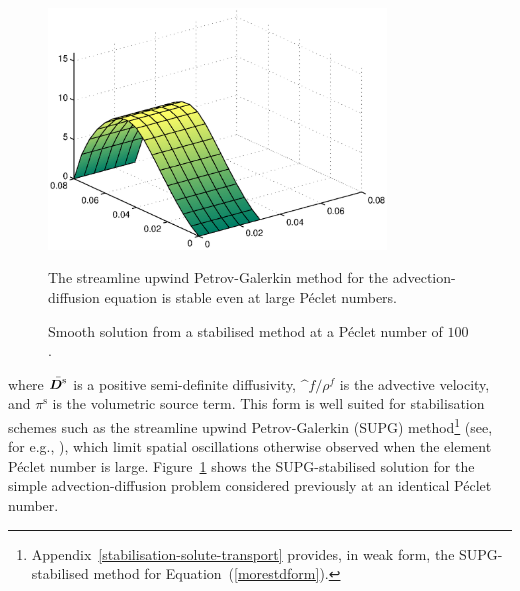 \begin{figure}
  \begin{center}
    \includegraphics[width=0.8\textwidth]{images/elucidation/stable-advection.eps}
    \caption{Smooth solution from a stabilised method at a P\'eclet
      number of $100$.}
    \label{stable-solution}
  \end{center}
      {The streamline upwind Petrov-Galerkin method for the
        advection-diffusion equation is stable even at large P\'eclet
        numbers.}
\end{figure}

\noindent where $\bar{\mbox{\boldmath$ D$}^\mathrm{s}}$ is a positive semi-definite
diffusivity, $\bm^{f}/\rho^{f}$ is the advective velocity, and
$\pi^\mathrm{s}$ is the volumetric source term. This form is well
suited for stabilisation schemes such as the streamline upwind
Petrov-Galerkin (SUPG)
method\footnote{Appendix~\ref{stabilisation-solute-transport}
  provides, in weak form, the SUPG-stabilised method for
  Equation~(\ref{morestdform}).} (see, for e.g., \cite{Paper6}), which
limit spatial oscillations otherwise observed when the element
P\'eclet number is large. Figure~\ref{stable-solution} shows the
SUPG-stabilised solution for the simple advection-diffusion problem
considered previously at an identical P\'eclet number.

%

